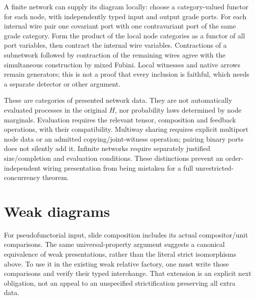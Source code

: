 \documentclass[11pt]{article}
\begin{document}
A finite network can supply its diagram locally: choose a category-valued functor for each node, with independently typed input and output grade ports. For each internal wire pair one covariant port with one contravariant port of the same grade category. Form the product of the local node categories as a functor of all port variables, then contract the internal wire variables. Contractions of a subnetwork followed by contraction of the remaining wires agree with the simultaneous construction by mixed Fubini. Local witnesses and native arrows remain generators; this is not a proof that every inclusion is faithful, which needs a separate detector or other argument.

These are categories of presented network data. They are not automatically evaluated processes in the original $H$, nor probability laws determined by node marginals. Evaluation requires the relevant tensor, composition and feedback operations, with their compatibility. Multiway sharing requires explicit multiport node data or an admitted copying/joint-witness operation; pairing binary ports does not silently add it. Infinite networks require separately justified size/completion and evaluation conditions. These distinctions prevent an order-independent wiring presentation from being mistaken for a full unrestricted-concurrency theorem.

\section{Weak diagrams}
For pseudofunctorial input, slide composition includes its actual compositor/unit comparisons. The same universal-property argument suggests a canonical equivalence of weak presentations, rather than the literal strict isomorphisms above. To use it in the existing weak relative factory, one must write those comparisons and verify their typed interchange. That extension is an explicit next obligation, not an appeal to an unspecified strictification preserving all extra data.
\end{document}
